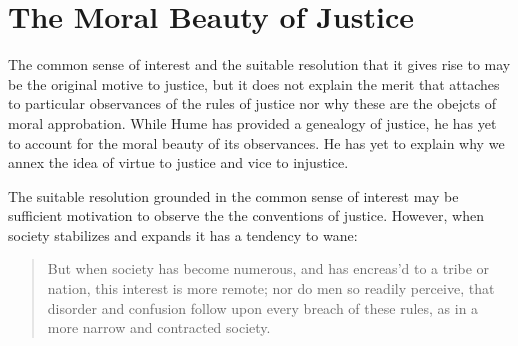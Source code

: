 

\section{The Moral Beauty of Justice}\label{sec:the_moral_beauty_of_justice} %


The common sense of interest and the suitable resolution that it gives rise to may be the original motive to justice, but it does not explain the merit that attaches to particular observances of the rules of justice nor why these are the obejcts of moral approbation. While Hume has provided a genealogy of justice, he has yet to account for the moral beauty of its observances. He has yet to explain why we annex the idea of virtue to justice and vice to injustice.

The suitable resolution grounded in the common sense of interest may be sufficient motivation to observe the the conventions of justice. However, when society stabilizes and expands it has a tendency to wane:

\begin{quote}
	But when society has become numerous, and has encreas'd to a tribe or nation, this interest is more remote; nor do men so readily perceive, that disorder and confusion follow upon every breach of these rules, as in a more narrow and contracted society.
\end{quote}

